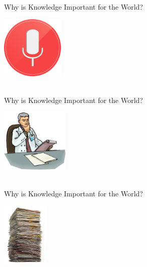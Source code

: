 \def\title{Why is Knowledge Important for the World?}
\begin{frame}{\title}
\begin{center}
  \includegraphics[height=3.0cm]{../img/google-now-voice.png} \\
  \vspace{2ex}
   \\
\end{center}
\end{frame}

\begin{frame}[noframenumbering]{\title}
\begin{center}
  \includegraphics[height=3.0cm]{../img/medical-literature.jpg} \\
  \vspace{2ex}
   \\
\end{center}
\end{frame}

\begin{frame}[noframenumbering]{\title}
\begin{center}
  \includegraphics[height=3.0cm]{../img/paper-stack.jpg} \\
  \vspace{2ex}
   \\
\end{center}
\end{frame}



